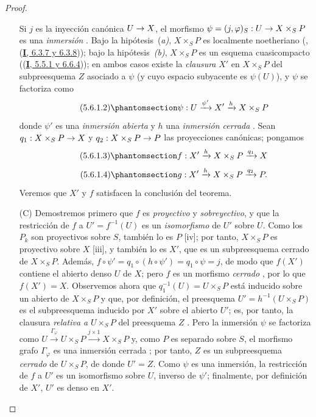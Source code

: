 \documentclass[oneside,10pt]{amsart}
\makeatletter
\newcommand{\ega@arrow}[2]{\mathchoice{#1}{#2}{#2}{#2}}
\renewcommand{\to}{\ega@arrow{\longrightarrow}{\rightarrow}}
\newcommand{\oldpage}[2][]{\marginnote{\normalfont\footnotesize\textbf{#1}~|~#2}\ignorespaces}
\let\EGAOriginalLabel\label
\renewcommand{\label}[1]{\phantomsection\EGAOriginalLabel{#1}}
\makeatother
\begin{document}
\begin{proof}
\begin{enumerate}
    Si $j$ es la inyección canónica $U\to X$, el morfismo $\psi=(j,\varphi)_S:U\to X\times_SP$ es una \emph{inmersión} .
    Bajo la hipótesis~(\emph{a)}, $X\times_SP$ es localmente noetheriano (, (\hyperref[I.6.3.7-fr]{\textbf{I}, 6.3.7 y 6.3.8}));
    bajo la hipótesis~\emph{(b)}, $X\times_SP$ es un esquema cuasicompacto ((\hyperref[I.5.5.1-fr]{\textbf{I}, 5.5.1 y 6.6.4}));
    en ambos casos existe la \emph{clausura} $X'$ en $X\times_SP$ del subpreesquema $Z$ asociado a $\psi$ (y cuyo espacio subyacente es $\psi(U)$), y $\psi$ se factoriza como
    \[
\tag{5.6.1.2}
\label{II.5.6.1.2-fr}
\psi:U\xrightarrow{\psi'}X'\xrightarrow{h}X\times_SP
\]
    donde $\psi'$ es una \emph{inmersión abierta} y $h$ una \emph{inmersión cerrada} .
    Sean $q_1:X\times_SP\to X$ y $q_2:X\times_SP\to P$ las proyecciones canónicas; pongamos
    \[
\tag{5.6.1.3}
\label{II.5.6.1.3-fr}
f:X'\xrightarrow{h}X\times_SP\xrightarrow{q_1}X
\]
    \[
\tag{5.6.1.4}
\label{II.5.6.1.4-fr}
g:X'\xrightarrow{h}X\times_SP\xrightarrow{q_2}P.
\]
    Veremos que $X'$ y $f$ satisfacen la conclusión del teorema.

  \item[(C)] Demostremos primero que $f$ es \emph{proyectivo} y \emph{sobreyectivo}, y que la restricción de $f$ a $U'=f^{-1}(U)$ es un \emph{isomorfismo} de $U'$ sobre $U$.
    Como los $P_k$ son proyectivos sobre $S$, también lo es $P$ [iv]; por tanto, $X\times_SP$ es proyectivo sobre $X$ [iii], y también lo es $X'$, que es un subpreesquema cerrado de $X\times_SP$.
    Además, $f\circ\psi'=q_1\circ(h\circ\psi')=q_1\circ\psi=j$, de modo que $f(X')$ contiene el abierto denso $U$ de $X$; pero $f$ es un morfismo \emph{cerrado} , por lo que $f(X')=X$.
    Observemos ahora que $q_1^{-1}(U)=U\times_SP$ está inducido sobre un abierto de $X\times_SP$ y que, por definición, el preesquema $U'=h^{-1}(U\times_SP)$ es el subpreesquema inducido por $X'$ sobre el abierto $U'$; es, por tanto, la clausura \emph{relativa a}
\oldpage[II]{108}
    $U\times_SP$ del preesquema $Z$ .
    Pero la inmersión $\psi$ se factoriza como $U\xrightarrow{\Gamma_\varphi}U\times_SP\xrightarrow{j\times1}X\times_SP$ y, como $P$ es separado sobre $S$, el morfismo grafo $\Gamma_\varphi$ es una inmersión cerrada ; por tanto, $Z$ es un subpreesquema \emph{cerrado} de $U\times_SP$, de donde $U'=Z$.
    Como $\psi$ es una inmersión, la restricción de $f$ a $U'$ es un isomorfismo sobre $U$, inverso de $\psi'$; finalmente, por definición de $X'$, $U'$ es denso en $X'$.


\end{enumerate}
\end{proof}
\end{document}
